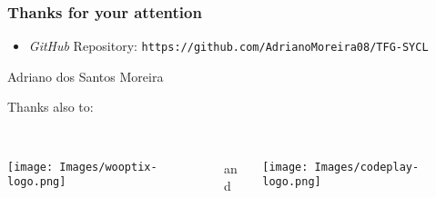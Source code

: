 \begin{frame} [fragile]
  \frametitle{Thanks for your attention}
    \begin{itemize}
    \item {\it GitHub} Repository: \texttt{https://github.com/AdrianoMoreira08/TFG-SYCL}
    \end{itemize}
    \begin{flushright}
    Adriano dos Santos Moreira  \\
    \end{flushright}
  \endblock{}
  Thanks also to: \\~\\
  {
  \begin{columns}
    \begin{column}{0.48\textwidth}
      \centering
      \texttt{[image: Images/wooptix-logo.png]}
    \end{column}
    \begin{column}{0.1\textwidth}
      {\Large and}
    \end{column}
    \begin{column}{0.48\textwidth}
      \centering
      \texttt{[image: Images/codeplay-logo.png]}
    \end{column}
  \end{columns}
  }
\end{frame}
